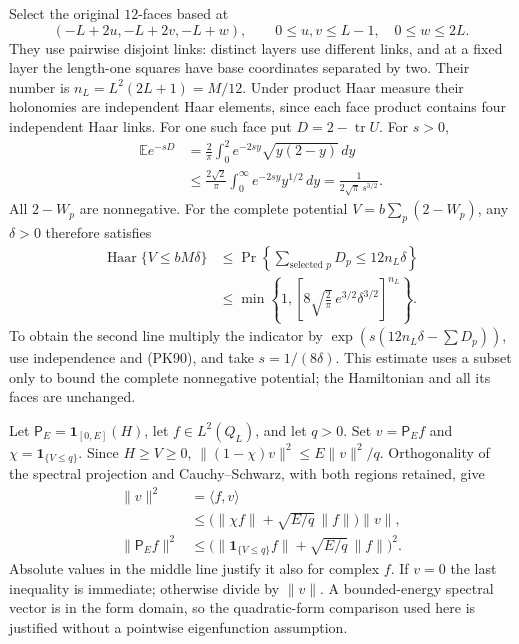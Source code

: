 \documentclass[11pt]{article}
\begin{document}
Select the original \(12\)-faces based at
\[
 (-L+2u,-L+2v,-L+w),\qquad
 0\le u,v\le L-1,\quad 0\le w\le2L .
 \tag{PK89}
\]
They use pairwise disjoint links: distinct layers use different links,
and at a fixed layer the length-one squares have base coordinates
separated by two. Their number is
\(n_L=L^2(2L+1)=M/12\).
Under product Haar measure their holonomies are independent Haar
elements, since each face product contains four independent Haar links.
For one such face put \(D=2-\operatorname{tr}U\). For \(s>0\),
\[
 \begin{split}
 \mathbb E e^{-sD}
 &=\frac2\pi\int_0^2e^{-2sy}\sqrt{y(2-y)}\,dy\\
 &\le\frac{2\sqrt2}{\pi}
        \int_0^\infty e^{-2sy}y^{1/2}\,dy
 =\frac1{2\sqrt\pi\,s^{3/2}} .
 \end{split}\tag{PK90}
\]
All \(2-W_p\) are nonnegative. For the complete potential
\(V=b\sum_p(2-W_p)\), any \(\delta>0\) therefore satisfies
\[
 \begin{split}
 \operatorname{Haar}\{V\le bM\delta\}
 &\le \Pr\!\left\{\sum_{\text{selected }p}D_p
                     \le12n_L\delta\right\}\\
 &\le
 \min\!\left\{1,\left[
       8\sqrt{\frac2\pi}\,e^{3/2}\delta^{3/2}
                     \right]^{n_L}\right\}.
 \end{split}\tag{PK91}
\]
To obtain the second line multiply the indicator by
\(\exp(s(12n_L\delta-\sum D_p))\), use independence and (PK90),
and take \(s=1/(8\delta)\). This estimate uses a subset only to
bound the complete nonnegative potential; the Hamiltonian and all its
faces are unchanged.

Let \(\mathsf P_E=\mathbf1_{[0,E]}(H)\), let \(f\in L^2(Q_L)\), and
let \(q>0\). Set \(v=\mathsf P_Ef\) and
\(\chi=\mathbf1_{\{V\le q\}}\). Since \(H\ge V\ge0\),
\(\|(1-\chi)v\|^2\le E\|v\|^2/q\). Orthogonality of the spectral
projection and Cauchy–Schwarz, with both regions retained, give
\[
 \begin{split}
 \|v\|^2
 &=\langle f,v\rangle\\
 &\le\bigl(\|\chi f\|+\sqrt{E/q}\,\|f\|\bigr)\|v\|,\\
 \|\mathsf P_Ef\|^2
 &\le\bigl(\|\mathbf1_{\{V\le q\}}f\|
                     +\sqrt{E/q}\,\|f\|\bigr)^2 .
 \end{split}\tag{PK92}
\]
Absolute values in the middle line justify it also for complex \(f\).
If \(v=0\) the last inequality is immediate; otherwise divide by
\(\|v\|\). A bounded-energy spectral vector is in the form domain,
so the quadratic-form comparison used here is justified without a
pointwise eigenfunction assumption.
\end{document}
